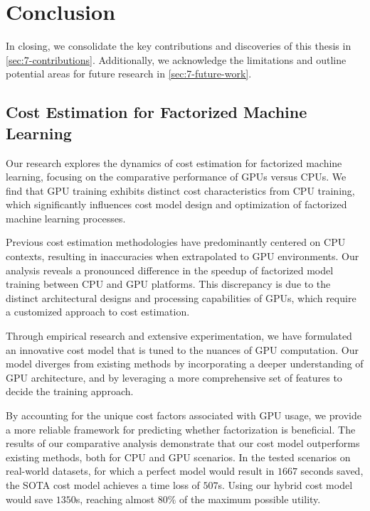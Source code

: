 
\chapter{Conclusion}

\label{chapter:conclusion}
In closing, we consolidate the key contributions and discoveries of this thesis in \autoref{sec:7-contributions}. Additionally, we acknowledge the limitations and outline potential areas for future research in \autoref{sec:7-future-work}.

\section{Cost Estimation for Factorized Machine Learning}
\label{sec:7-contributions}
Our research explores the dynamics of cost estimation for factorized machine learning, focusing on the comparative performance of GPUs versus CPUs. We find that GPU training exhibits distinct cost characteristics from CPU training, which significantly influences cost model design and optimization of factorized machine learning processes.

Previous cost estimation methodologies have predominantly centered on CPU contexts, resulting in inaccuracies when extrapolated to GPU environments. Our analysis reveals a pronounced difference in the speedup of factorized model training between CPU and GPU platforms. This discrepancy is due to the distinct architectural designs and processing capabilities of GPUs, which require a customized approach to cost estimation.

Through empirical research and extensive experimentation, we have formulated an innovative cost model that is tuned to the nuances of GPU computation. Our model diverges from existing methods by incorporating a deeper understanding of GPU architecture, and by leveraging a more comprehensive set of features to decide the training approach.

By accounting for the unique cost factors associated with GPU usage, we provide a more reliable framework for predicting whether factorization is beneficial. The results of our comparative analysis demonstrate that our cost model outperforms existing methods, both for CPU and GPU scenarios. In the tested scenarios on real-world datasets, for which a perfect model would result in $1667$ seconds saved, the SOTA cost model achieves a time loss of $507$s. Using our hybrid cost model would save $1350$s, reaching almost $80\%$ of the maximum possible utility.

